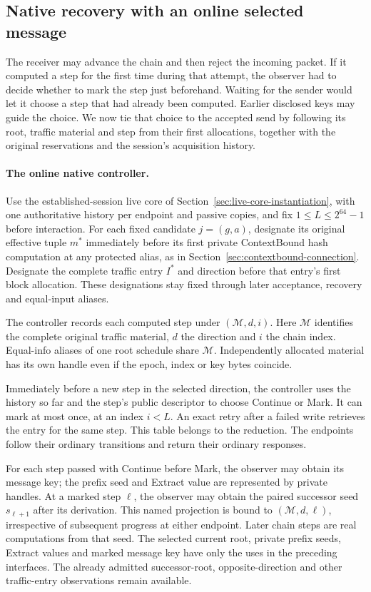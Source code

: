 \documentclass[pdflatex]{sn-jnl}
\theoremstyle{thmstyleone}
\theoremstyle{thmstylethree}
\theoremstyle{thmstyletwo}
\begin{document}
\subsection{Native recovery with an online selected message}
\label{sec:native-online-chain}

The receiver may advance the chain and then reject the incoming
packet. If it computed a step for the first time during that attempt,
the observer had to decide whether to mark the step just beforehand.
Waiting for the sender would let it choose a step that had already
been computed. Earlier disclosed keys may guide the choice. We now
tie that choice to the accepted send by following its root, traffic
material and step from their first allocations, together with the
original reservations and the session's acquisition history.

\paragraph{The online native controller.}
Use the established-session live core of
Section~\ref{sec:live-core-instantiation}, with one authoritative history
per endpoint and passive copies, and fix $1\le L\le2^{64}-1$ before
interaction. For each fixed candidate $j=(g,a)$, designate its original
effective tuple $m^*$ immediately before its first private ContextBound
hash computation at any protected alias, as in
Section~\ref{sec:contextbound-connection}. Designate the complete
traffic entry $I^*$ and direction before that entry's first block allocation.
These designations stay fixed through later acceptance, recovery and
equal-input aliases.

The controller records each computed step under $(\mathcal M,d,i)$.
Here $\mathcal M$ identifies the complete original traffic material,
$d$ the direction and $i$ the chain index. Equal-info aliases of one
root schedule share $\mathcal M$. Independently allocated material has
its own handle even if the epoch, index or key bytes coincide.

Immediately before a new step in the selected direction, the controller
uses the history so far and the step's public descriptor to choose
Continue or Mark. It can mark at most once, at an index $i<L$. An exact retry after a
failed write retrieves the entry for the same step. This table belongs
to the reduction. The endpoints follow their ordinary transitions and
return their ordinary responses.

For each step passed with Continue before Mark, the observer may obtain
its message key; the prefix seed and Extract value are represented by
private handles. At a marked
step $\ell$, the observer may obtain the paired successor seed
$s_{\ell+1}$ after its derivation. This named projection is bound to
$(\mathcal M,d,\ell)$, irrespective of subsequent progress at either
endpoint. Later chain steps are real computations from that seed.
The selected current root, private prefix seeds, Extract values and
marked message key have only the uses in the preceding interfaces.
The already admitted successor-root, opposite-direction and other
traffic-entry observations remain available.
\end{document}
